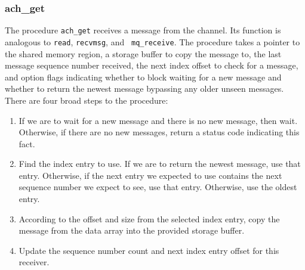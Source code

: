 \documentclass[letterpaper]{IEEEtran}
\begin{document}

\noindent\subsubsection{ach\_get}
The procedure {\tt ach\_get} receives a message from the channel.  Its
function is analogous to {\tt read}, {\tt recvmsg}, and {\tt
  mq\_receive}.  The procedure takes a pointer to the shared memory
region, a storage buffer to copy the message to, the last message
sequence number received, the next index offset to check for a
message, and option flags indicating whether to block waiting for a
new message and whether to return the newest message bypassing any
older unseen messages.  There are four broad steps to the procedure:
{\small
\begin{enumerate}[(1)]
  \item If we are to wait for a new message and there is no new message,
    then wait.  Otherwise, if there are no new messages,
    return a status code indicating this fact.
  \item Find the index entry to use.  If we are to return the newest
    message, use that entry.  Otherwise, if the next entry we expected
    to use contains the next sequence number we expect to see, use
    that entry.  Otherwise, use the oldest entry.
  \item According to the offset and size from the selected index
    entry, copy the message from the data array into the provided
    storage buffer.
  \item Update the sequence number count and next index entry offset
    for this receiver.
\end{enumerate}}
\end{document}
